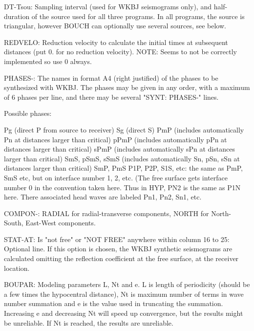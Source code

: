 DT-Tsou: Sampling interval (used for WKBJ seismograms only), and half-duration of the source used for all three programs. In all programs, the source is triangular, however BOUCH can optionally use several sources, see below. 

REDVELO: Reduction velocity to calculate the initial times at subsequent distances (put 0. for no reduction velocity).
NOTE: Seems to not be correctly implemented so use 0 always.

PHASES-: The names in format A4 (right justified) of the phases to be  synthesized with WKBJ. The phases may be given in any order, with a maximum of  6 phases per line, and there may be several "SYNT: PHASES-" lines. 

Possible phases: 

Pg (direct P from source to receiver) \newline
Sg (direct S) \newline
PmP (includes automatically Pn at distances larger than critical) \newline
pPmP (includes automatically pPn at distances larger than critical) \newline
sPmP (includes automatically sPn at distances larger than critical) \newline
SmS, pSmS, sSmS (includes automatically Sn, pSn, sSn at distances larger than  critical) \newline
SmP, PmS \newline
P1P, P2P, S1S, etc: the same as PmP, SmS etc, but on interface number 1, 2, etc.  \newline
(The free surface gets interface number 0 in the convention taken here.
Thus in HYP, PN2 is the same as P1N here. There 
associated head waves are labeled Pn1, Pn2, Sn1, etc. 

COMPON-: RADIAL for radial-transverse components, NORTH for North-South, East-West components. 

STAT-AT: Is "not free" or "NOT FREE" anywhere within column 16 to 25: Optional line. If this option is chosen, the WKBJ synthetic seismograms are calculated omitting the reflection coefficient at the free surface, at the receiver location. 

BOUPAR: Modeling parameters L, Nt and e. L is length of periodicity 
(should be a few times the hypocentral distance), Nt is maximum 
number of terms in wave number summation and e is the value used 
in truncating the summation. Increasing e and decreasing Nt will 
speed up convergence, but the results might be unreliable.
If Nt is reached, the results are unreliable.

